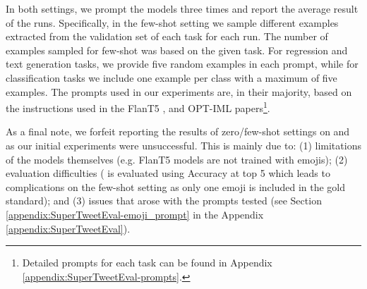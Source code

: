 In both settings, we prompt the models three times and report the average result of the runs. Specifically, in the few-shot setting we sample different examples extracted from the validation set of each task for each run. The number of examples sampled for few-shot was based on the given task. For regression and text generation tasks, we provide five random examples in each prompt, while for classification tasks we include one example per class with a maximum of five examples. The prompts used in our experiments are, in their majority, based on the instructions used in the FlanT5 \cite{https://doi.org/10.48550/arxiv.2210.11416}, and OPT-IML \cite{iyer2023optiml} papers\footnote{Detailed prompts for each task can be found in Appendix \ref{appendix:SuperTweetEval-prompts}.}.

As a final note, we forfeit reporting the results of zero/few-shot settings on {\TweetNER} and {\TweetEmoji} as our initial experiments were unsuccessful. This is mainly due to: (1) limitations of the models themselves (e.g. FlanT5 models are not trained with emojis); (2) evaluation difficulties ({\TweetEmoji} is evaluated using Accuracy at top 5 which leads to complications on the few-shot setting as only one emoji is included in the gold standard); and (3) issues that arose with the prompts tested (see Section \ref{appendix:SuperTweetEval-emoji_prompt} in the Appendix \ref{appendix:SuperTweetEval}).

